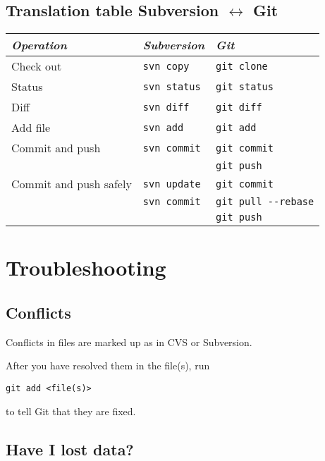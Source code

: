 \documentclass[12pt,pdftex]{article}
\begin{document}
\subsection{Translation table Subversion \(\leftrightarrow\) Git}
\label{sec-2-6}

\begin{center}
\begin{tabular}{lll}
\toprule
\emph{Operation} & \emph{Subversion} & \emph{Git}\\
\midrule
Check out & \texttt{svn copy} & \texttt{git clone}\\
\midrule
Status & \texttt{svn status} & \texttt{git status}\\
\midrule
Diff & \texttt{svn diff} & \texttt{git diff}\\
\midrule
Add file & \texttt{svn add} & \texttt{git add}\\
\midrule
Commit and push & \texttt{svn commit} & \texttt{git commit}\\
 &  & \texttt{git push}\\
\midrule
Commit and push safely & \texttt{svn update} & \texttt{git commit}\\
 & \texttt{svn commit} & \texttt{git pull -{}-rebase}\\
 &  & \texttt{git push}\\
\bottomrule
\end{tabular}
\end{center}


\section{Troubleshooting}
\label{sec-3}

\subsection{Conflicts}
\label{sec-3-1}

Conflicts in files are marked up as in CVS or Subversion.

After you have resolved them in the file(s), run
\lstset{frame=single,basicstyle=\ttfamily\footnotesize,language=sh,label= ,caption= ,captionpos=b,numbers=none}
\begin{lstlisting}
git add <file(s)>
\end{lstlisting}
to tell Git that they are fixed.


\subsection{Have I lost data?}
\label{sec-3-2}
\end{document}
